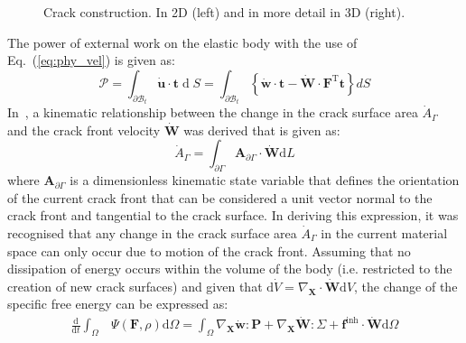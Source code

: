 \documentclass[onecolumn]{svjour3}
\begin{document}
\begin{figure}[th]
\setlength{\fboxsep}{0pt}%
\setlength{\fboxrule}{0pt}%
\begin{center}
\def\svgwidth{7cm} 	 
\end{center}
\caption{Crack construction. In 2D (left) and in more detail in 3D (right).}
\label{fig:crac_surf_construct} 
\end{figure}
% 
% 
The power of external work on the elastic body with the use of Eq.~(\ref{eq:phy_vel}) is given as: 
\begin{equation} \label{eq:extern_pow}
	\mathscr{P} =\int_{\partial \mathscr{B}_{t}} \dot{\mathbf{u}} \cdot \mathbf{t} \operatorname{d} S=\int_{\partial \mathscr{B}_{t}}\left\{\dot{\mathbf{w}} \cdot \mathbf{t}-\dot{\mathbf{W}} \cdot \mathbf{F}^{\mathrm{T}} \mathbf{t}\right\} d S
\end{equation}
% 
In~\cite{kaczmarczyk2017energy}, a kinematic relationship between the change in the
crack surface area $\dot{A}_\Gamma$ and the crack front velocity $\dot{\mathbf{W}}$ was derived that is given as:
\begin{equation}
\label{eq::Agamma2}
\dot{A}_\Gamma
 =
\int_{\partial\Gamma}
\mathbf{A}_{\partial\Gamma} \cdot \dot{\mathbf{W}} \textrm{d}L
\end{equation}
where 
$\mathbf{A}_{\partial\Gamma}$ is a dimensionless kinematic state variable that defines the orientation of the current crack front that can be considered a unit vector normal to the crack front and tangential to the crack surface. In deriving this expression, it was recognised that any change in the crack surface area $\dot{A}_\Gamma$ in the current material space can only occur due to motion of the crack front.
% 
Assuming that no dissipation of energy occurs within the volume of the body (i.e. restricted to the creation of new crack surfaces) and given that $\mathrm d \dot V = \nabla _{\mathbf X} \cdot \mathbf{\dot W} \mathrm d V$, the change of the specific free energy can be expressed as:
\begin{equation} \label{eq:psi_time}
	\begin{aligned}
		\frac{\mathrm{d}}{\mathrm{d} t} \int_{\Omega} & \Psi(\mathbf{F}, \rho) \mathrm{d} \Omega =
		 \int_{\Omega} \nabla_{\mathbf{X}} \dot{\mathbf{w}}: \mathbf{P} 
		+ \nabla_{\mathbf{X}} \dot{\mathbf{W}}: \Sigma 
		+ \mathbf f^\mathrm{inh} \cdot \dot{\mathbf{W}} \mathrm{d} \Omega
	\end{aligned}
	\end{equation}
\end{document}
